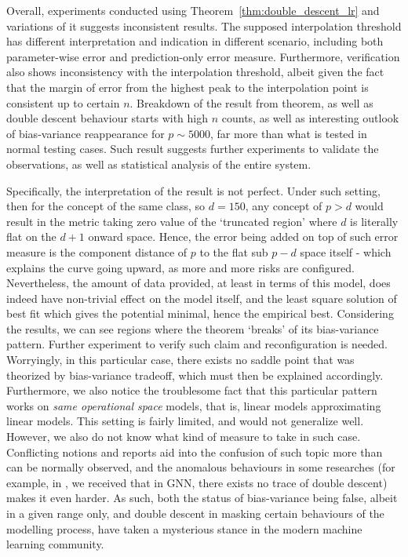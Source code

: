 \documentclass[10pt]{article}
\begin{document}
Overall, experiments conducted using Theorem~\ref{thm:double_descent_lr} and variations of it suggests inconsistent results. The supposed interpolation threshold has different interpretation and indication in different scenario, including both parameter-wise error and prediction-only error measure. Furthermore, verification also shows inconsistency with the interpolation threshold, albeit given the fact that the margin of error from the highest peak to the interpolation point is consistent up to certain $n$. Breakdown of the result from theorem, as well as double descent behaviour starts with high $n$ counts, as well as interesting outlook of bias-variance reappearance for $p\sim 5000$, far more than what is tested in normal testing cases. Such result suggests further experiments to validate the observations, as well as statistical analysis of the entire system. 

Specifically, the interpretation of the result is not perfect. Under such setting, then for the concept of the same class, so $d=150$, any concept of $p>d$ would result in the metric taking zero value of the `truncated region' where $d$ is literally flat on the $d+1$ onward space. Hence, the error being added on top of such error measure is the component distance of $p$ to the flat sub $p-d$ space itself - which explains the curve going upward, as more and more risks are configured. Nevertheless, the amount of data provided, at least in terms of this model, does indeed have non-trivial effect on the model itself, and the least square solution of best fit which gives the potential minimal, hence the empirical best. Considering the results, we can see regions where the theorem `breaks' of its bias-variance pattern. Further experiment to verify such claim and reconfiguration is needed. Worryingly, in this particular case, there exists no saddle point that was theorized by bias-variance tradeoff, which must then be explained accordingly. Furthermore, we also notice the troublesome fact that this particular pattern works on \textit{same operational space} models, that is, linear models approximating linear models. This setting is fairly limited, and would not generalize well. However, we also do not know what kind of measure to take in such case. Conflicting notions and reports aid into the confusion of such topic more than can be normally observed, and the anomalous behaviours in some researches (for example, in \cite{shi2024homophilymodulatesdoubledescent}, we received that in GNN, there exists no trace of double descent) makes it even harder. As such, both the status of bias-variance being false, albeit in a given range only, and double descent in masking certain behaviours of the modelling process, have taken a mysterious stance in the modern machine learning community.
\end{document}
